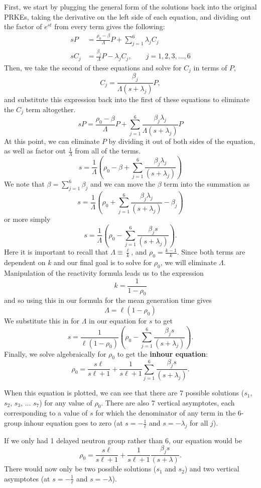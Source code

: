 \documentclass{report}
\begin{document}
First, we start by plugging the general form of the solutions back into the original PRKEs, taking the derivative on the left side of each equation, and dividing out the factor of $e^{st}$ from every term gives the following:
\begin{align*}
sP	&= \frac{\rho_0 - \beta}{\Lambda} P + \sum_{j=1}^6 \lambda_j C_j \\
sC_j	&= \frac{\beta_j}{\Lambda} P - \lambda_j C_j , \qquad j= 1,2,3,...,6
\end{align*}
Then, we take the second of these equations and solve for $C_j$ in terms of $P$,
$$ C_j = \frac{\beta_j}{\Lambda(s+\lambda_j)}P ,$$
and substitute this expression back into the first of these equations to eliminate the $C_j$ term altogether.
$$ sP = \frac{\rho_0 - \beta}{\Lambda} P + \sum_{j=1}^6 \frac{\beta_j \lambda_j}{\Lambda(s+\lambda_j)}P $$ 
At this point, we can eliminate $P$ by dividing it out of both sides of the equation, as well as factor out $\frac{1}{\Lambda}$ from all of the terms.
$$ s = \frac{1}{\Lambda}\left(\rho_0 - \beta + \sum_{j=1}^6 \frac{\beta_j \lambda_j}{(s+\lambda_j)}\right) $$ 
We note that $\beta = \sum_{j=1}^6 \beta_j$ and we can move the $\beta$ term into the summation as
$$ s = \frac{1}{\Lambda}\left(\rho_0 + \sum_{j=1}^6 \frac{\beta_j \lambda_j}{(s+\lambda_j)}-\beta_j\right) $$ 
or more simply
$$ s = \frac{1}{\Lambda}\left(\rho_0 - \sum_{j=1}^6 \frac{\beta_j s}{(s+\lambda_j)}\right) .$$ 
Here it is important to recall that $\Lambda \equiv \frac{\ell}{k}$, and $\rho_0 = \frac{k-1}{k}$. Since both terms are dependent on $k$ and our final goal is to solve for $\rho_0$, we will eliminate $\Lambda$. Manipulation of the reactivity formula leads us to the expression
$$ k = \frac{1}{1-\rho_0} $$
and so using this in our formula for the mean generation time gives
$$ \Lambda = \ell(1-\rho_0) $$
We substitute this in for $\Lambda$ in our equation for $s$ to get
$$ s = \frac{1}{\ell(1-\rho_0)}\left(\rho_0 - \sum_{j=1}^6 \frac{\beta_j s}{(s+\lambda_j)}\right) .$$
Finally, we solve algebraically for $\rho_0$ to get the \textbf{inhour equation}:
$$ \rho_0 = \frac{s\ell}{s\ell + 1} + \frac{1}{s\ell + 1}\sum_{j=1}^6 \frac{\beta_j s}{(s+\lambda_j)} .$$ 

When this equation is plotted, we can see that there are 7 possible solutions ($s_1$, $s_2$, $s_3$, ... $s_7$) for any value of $\rho_0$. There are also 7 vertical asymptotes, each corresponding to a value of $s$ for which the denominator of any term in the 6-group inhour equation goes to zero (at $s=-\frac{1}{\ell}$ and $s=-\lambda_j$ for all $j$).

If we only had 1 delayed neutron group rather than 6, our equation would be 
$$ \rho_0 = \frac{s\ell}{s\ell + 1} + \frac{1}{s\ell + 1}\frac{\beta_j s}{(s+\lambda)} .$$ 
There would now only be two possible solutions ($s_1$ and $s_2$) and two vertical asymptotes (at $s=-\frac{1}{\ell}$ and $s=-\lambda$).
\end{document}

